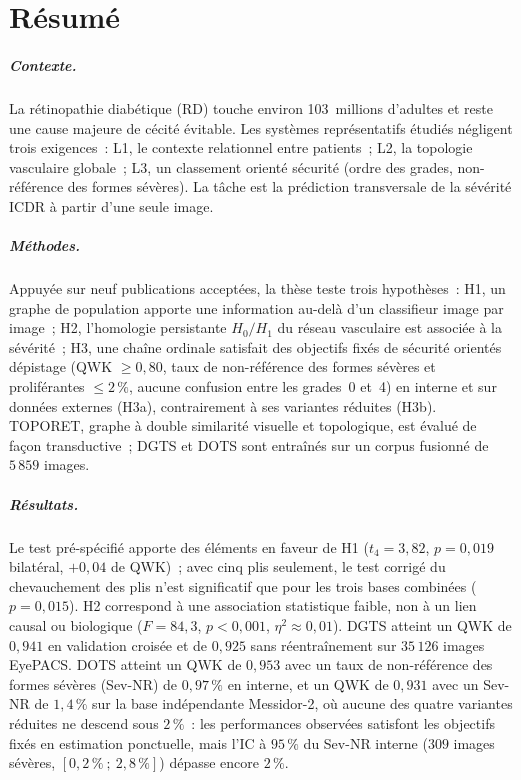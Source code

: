 \chapter*{R\'esum\'e}
\begingroup{}

\paragraph{Contexte.}
La r\'etinopathie diab\'etique (RD) touche environ 103~millions d'adultes et reste une
cause majeure de c\'ecit\'e \'evitable. Les syst\`emes repr\'esentatifs \'etudi\'es
n\'egligent trois exigences~: L1, le contexte relationnel entre patients~; L2, la topologie
vasculaire globale~; L3, un classement orient\'e s\'ecurit\'e (ordre des grades,
non-r\'ef\'erence des formes s\'ev\`eres). La t\^ache est la pr\'ediction transversale de la
s\'ev\'erit\'e ICDR \`a partir d'une seule image.

\paragraph{M\'ethodes.}
Appuy\'ee sur neuf publications accept\'ees, la th\`ese teste trois hypoth\`eses~: H1, un
graphe de population apporte une information au-del\`a d'un classifieur image par image~;
H2, l'homologie persistante $H_0/H_1$ du r\'eseau vasculaire est associ\'ee \`a la
s\'ev\'erit\'e~; H3, une cha\^ine ordinale satisfait des objectifs fix\'es de s\'ecurit\'e orient\'es
d\'epistage (QWK $\geq0{,}80$, taux de non-r\'ef\'erence des formes s\'ev\`eres et
prolif\'erantes $\leq2\,\%$, aucune confusion entre les grades~0 et~4) en interne et sur
donn\'ees externes (H3a), contrairement \`a ses variantes r\'eduites (H3b). TOPORET, graphe
\`a double similarit\'e visuelle et topologique, est \'evalu\'e de fa\c{c}on transductive~;
DGTS et DOTS sont entra\^in\'es sur un corpus fusionn\'e de $5\,859$ images.

\paragraph{R\'esultats.}
Le test pr\'e-sp\'ecifi\'e apporte des \'el\'ements en faveur de H1 ($t_4=3{,}82$,
$p=0{,}019$ bilat\'eral, $+0{,}04$ de QWK)~; avec cinq plis seulement, le test corrig\'e du
chevauchement des plis n'est significatif que pour les trois bases combin\'ees
($p=0{,}015$). H2 correspond \`a une association statistique faible, non \`a un lien causal
ou biologique ($F=84{,}3$, $p<0{,}001$, $\eta^2\approx0{,}01$). DGTS atteint un QWK de $0{,}941$ en validation crois\'ee et de
$0{,}925$ sans r\'eentra\^inement sur $35\,126$ images EyePACS. DOTS atteint un QWK de
$0{,}953$ avec un taux de non-r\'ef\'erence des formes s\'ev\`eres (Sev-NR) de $0{,}97\,\%$ en interne, et un QWK de $0{,}931$ avec un Sev-NR de
$1{,}4\,\%$ sur la base ind\'ependante Messidor-2, o\`u aucune des quatre variantes
r\'eduites ne descend sous $2\,\%$~: les performances observ\'ees satisfont les objectifs fix\'es en estimation
ponctuelle, mais l'IC \`a $95\,\%$ du Sev-NR interne ($309$ images s\'ev\`eres,
$[0{,}2\,\%~;~2{,}8\,\%]$) d\'epasse encore $2\,\%$.

